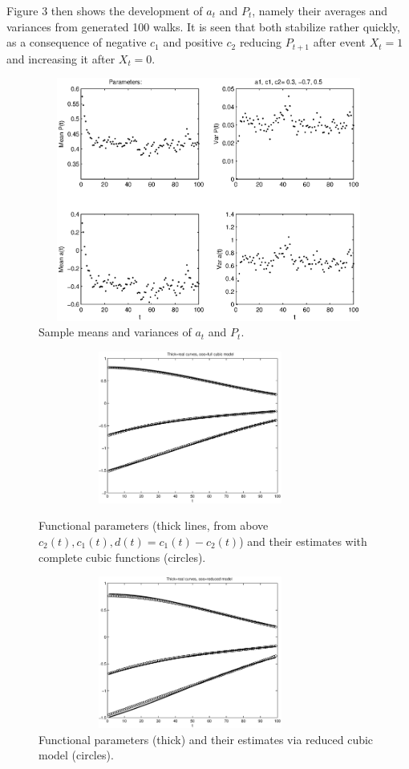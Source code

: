 \documentclass[11pt]{article}
\begin{document}
Figure 3 then shows the development of $a_t$ and $P_t$, namely their
averages and variances from generated 100 walks. It is seen that
both stabilize rather quickly, as a consequence of negative $c_1$
and positive $c_2$ reducing $P_{t+1}$ after event $X_t=1$ and
increasing it after $X_t=0$.

\begin{figure}[h]
\centering
    \includegraphics[width = 12cm,height=8cm]{simgener1.eps}
\caption{Sample means and variances of $a_t$ and $P_t$.}
\end{figure}

\begin{figure}[h]
\centering
    \includegraphics[width = 10cm,height=5cm]{simest_t.eps}
 \caption{Functional parameters (thick lines, from above
$c_2(t), c_1(t), d(t)= c_1(t)-c_2(t)$) and their estimates with
complete cubic functions (circles).}

\centering
   \includegraphics[width = 10cm,height=5cm]{simest_t_reduced.eps}
\caption{Functional parameters (thick) and their estimates via
reduced cubic model (circles).}
\end{figure}
\end{document}
